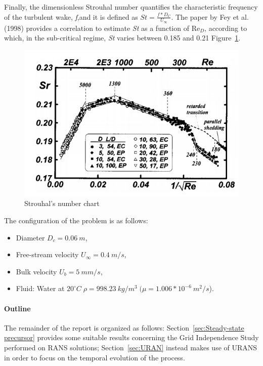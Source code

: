\documentclass[12pt]{article}
\begin{document}
        Finally, the dimensionless Strouhal number quantifies the characteristic frequency of the turbulent wake, \textit{f},and it is defined as $St = \frac{f*D_C}{U_\infty}$. The paper by Fey et al. (1998) provides a correlation to estimate \textit{St} as a function of $\text{Re}_D$, according to which, in the sub-critical regime, \textit{St} varies between 0.185 and 0.21 Figure~\ref{fig:strouhal}.


 \begin{figure}[!ht]
                \includegraphics[width=\textwidth]{Strouhal.png}
                \centering
                \caption{Strouhal's number chart}
                \label{fig:strouhal}
        \end{figure}


        The configuration of the problem is as follows:
        \begin{itemize}
                \item Diameter \( D_c = 0.06 \: m \),
                \item Free-stream velocity \( U_\infty = 0.4 \: m/s \),
                \item Bulk velocity \( U_b = 5 \: mm/s \),
                \item Fluid: Water at \( 20^{\circ}C \; \rho = 998.23 \: kg/m^3\;( \mu=1.006*10^{-6} \:m^2/s\)).
        \end{itemize}


        \paragraph{Outline}
        The remainder of the report is organized as follows: Section~\ref{sec:Steady-state precursor} provides some suitable results concerning the Grid Independence Study performed on RANS solutions; Section~\ref{sec:URAN} instead makes use of URANS in order to focus on the temporal evolution  of the process.
      
\end{document}
